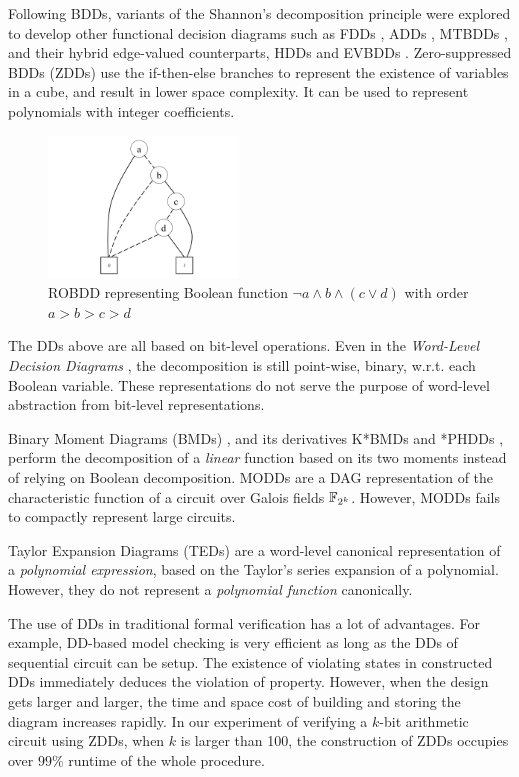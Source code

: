 Following BDDs,  variants of the Shannon's decomposition principle
were explored to develop other functional decision diagrams such as
 FDDs \cite{okfdd}, ADDs \cite{add}, MTBDDs \cite{mtbdd}, and their hybrid 
edge-valued counterparts, HDDs \cite{hdd} and EVBDDs \cite{evbdd}. 
Zero-suppressed BDDs (ZDDs) \cite{minato1993zero,minato1994calculation} use the if-then-else branches
to represent the existence of variables in a cube, and result in lower 
space complexity. It can be used to represent polynomials with integer coefficients.

\begin{figure}[h]
\centerline{
\includegraphics[width=0.45\textwidth]{newfig/BDD.pdf}
}
\caption{ROBDD representing Boolean function $\neg a \land b \land (c\lor d)$ with order $a>b>c>d$}
\label{fig:BDD}
\end{figure}

The DDs above are all based on bit-level operations. Even in the {\it Word-Level Decision Diagrams}
\cite{WLS}, the decomposition is still point-wise, binary, 
w.r.t. each Boolean variable. These representations do not
serve the purpose of word-level abstraction from bit-level
representations. 

Binary Moment Diagrams (BMDs) \cite{bmd}, and its derivatives K*BMDs
\cite{kbmd} and *PHDDs \cite{phdd}, perform the decomposition of a {\it linear} function
based on its two moments instead of relying on Boolean decomposition. 
MODDs \cite{modd,modd_tcomp} are a DAG representation of the
characteristic function of a circuit over Galois fields ${\mathbb{F}}_{2^k}$. 
However, MODDs fails to compactly represent large circuits.


Taylor Expansion Diagrams (TEDs) \cite{ted_tcomp} are a
word-level canonical representation of a {\it polynomial expression},
based on the Taylor's series expansion of a polynomial. However, they do
not represent a {\it polynomial function} canonically. 

The use of DDs in traditional formal verification has a lot of advantages. 
For example, DD-based model checking is very efficient as long as the DDs of sequential 
circuit can be setup. The existence of violating states in constructed DDs 
immediately deduces the violation of property. However, when the design gets
larger and larger, the time and space cost of building and storing the diagram 
increases rapidly. In our experiment of verifying a $k$-bit arithmetic circuit 
using ZDDs, when $k$ is larger than 100, the construction of ZDDs occupies 
over $99\%$ runtime of the whole procedure.
